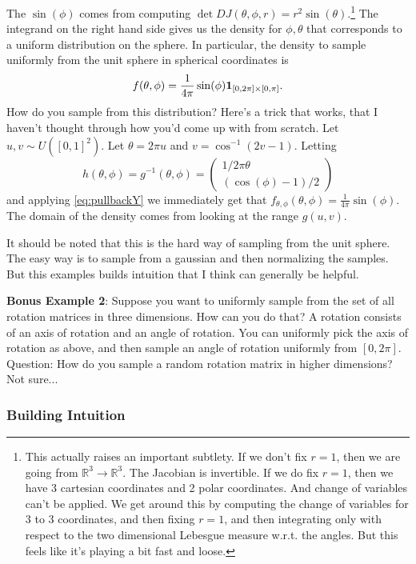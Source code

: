 \documentclass{book}
\newcommand{\R}{\mathbb{R}}
\newcommand{\ones}{{\bf 1}}
\begin{document}
The $\sin(\phi)$ comes from computing $\det DJ(\theta, \phi, r) = r^2\sin(\theta)$.\footnote{This actually raises an important subtlety. If we don't fix $r=1$, then we are going from $\R^3\to \R^3$. The Jacobian is invertible. If we do fix $r=1$, then we have 3 cartesian coordinates and 2 polar coordinates. And change of variables can't be applied. We get around this by computing the change of variables for 3 to 3 coordinates, and then fixing $r=1$, and then integrating only with respect to the two dimensional Lebesgue measure w.r.t. the angles. But this feels like it's playing a bit fast and loose.}
The integrand on the right hand side gives us the density for $\phi, \theta$ that corresponds to a uniform distribution on the sphere. In particular, the density to sample uniformly from the unit sphere in spherical coordinates is
$$
f(\theta, \phi) = \frac{1}{4\pi}\sin(\phi)\ones_{[0, 2\pi]\times [0, \pi]}.
$$
How do you sample from this distribution? Here's a trick that works, that I haven't thought through how you'd come up with from scratch. Let $u,v\sim U([0,1]^2)$. Let $\theta = 2\pi u$ and $v = \cos^{-1}(2v-1)$. Letting
$$
h(\theta, \phi) = g^{-1}(\theta, \phi) = 
\begin{pmatrix}
1/2\pi \theta\\
(\cos(\phi) - 1)/2
\end{pmatrix}
$$ and 
applying \eqref{eq:pullbackY} we immediately get that $f_{\theta, \phi}(\theta, \phi) = \frac{1}{4\pi}\sin(\phi)$. The domain of the density comes from looking at the range $g(u, v)$. 

It should be noted that this is the hard way of sampling from the unit sphere. The easy way is to sample from a gaussian and then normalizing the samples. But this examples builds intuition that I think can generally be helpful. 

\textbf{Bonus Example 2}: 
Suppose you want to uniformly sample from the set of all rotation matrices in three dimensions. How can you do that? A rotation consists of an axis of rotation and an angle of rotation. You can uniformly pick the axis of rotation as above, and then sample an angle of rotation uniformly from $[0, 2\pi]$. Question: How do you sample a random rotation matrix in higher dimensions? Not sure...


\vspace{1em}
\subsubsection{Building Intuition}
\end{document}
